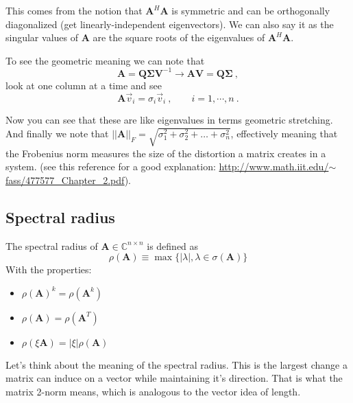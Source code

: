 \documentclass[12pt]{article}
\newcommand{\ve}[1]{\ensuremath{\mathbf{#1}}}
\newcommand{\cc}[1]{\ensuremath{\overline{#1}}}
\newcommand{\ccm}[1]{\ensuremath{\overline{\mathbf{#1}}}}
\begin{document}
This comes from the notion that $\ve{A}^H\ve{A}$ is symmetric and can be orthogonally diagonalized (get linearly-independent eigenvectors). We can also say it as the singular values of $\ve{A}$ are the square roots of the eigenvalues of $\ve{A}^H\ve{A}$. 

To see the geometric meaning we can note that 
\[\ve{A} = \ve{Q} \ve{\Sigma} \ve{V}^{-1} \rightarrow \ve{A}\ve{V} = \ve{Q} \ve{\Sigma} \:,\]
look at one column at a time and see
\[\ve{A}\vec{v}_i = \sigma_i \vec{v}_i \:, \qquad i = 1, \cdots, n \:.\]

Now you can see that these are like eigenvalues in terms geometric stretching. And finally we note that $||\ve{A}||_F = \sqrt{\sigma_1^2 + \sigma_2^2 + \dots + \sigma_n^2}$, effectively meaning that the Frobenius norm measures the size of the distortion a matrix creates in a system. (see this reference for a good explanation: \href{http://www.math.iit.edu/~fass/477577_Chapter_2.pdf}{http://www.math.iit.edu/$\sim$fass/477577\_Chapter\_2.pdf}).


\subsection{Spectral radius} 

The spectral radius of $\ve{A} \in \mathbb{C}^{n \times n}$ is defined as 
\[\rho(\ve{A}) \equiv \max \lbrace |\lambda|, \lambda \in \sigma(\ve{A}) \rbrace\]
With the properties:
%
\begin{itemize}
\item $\rho(\ve{A})^k = \rho(\ve{A}^k)$
\item $\rho(\ve{A}) = \rho(\ve{A}^T)$
\item $\rho(\xi \ve{A}) = |\xi| \rho(\ve{A})$
\end{itemize}
%
Let's think about the meaning of the spectral radius. This is the largest change a matrix can induce on a vector while maintaining it's direction. That is what the matrix 2-norm means, which is analogous to the vector idea of length.

% 
\end{document}
